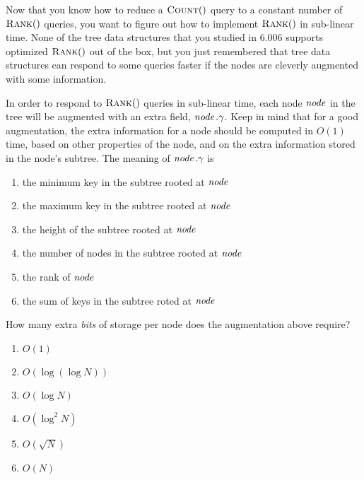 \documentclass[12pt,twoside]{article}
\begin{document}
\begin{problems}
Now that you know how to reduce a $\textnormal{\scshape Count}()$ query to a constant number of
$\textnormal{\scshape Rank}()$ queries, you want to figure out how to implement
$\textnormal{\scshape Rank}()$ in sub-linear time. None of the tree data structures that you
studied in 6.006 supports optimized $\textnormal{\scshape Rank}()$ out of the box, but you just
remembered that tree data structures can respond to some queries faster if the
nodes are cleverly augmented with some information.

\begin{problemparts}
\problempart {} In order to respond to $\textnormal{\scshape Rank}()$ queries in
sub-linear time, each node $\id{node}$ in the tree will be augmented with an
extra field, $\attribix{node}{\gamma}$. Keep in mind that for a good
augmentation, the extra information for a node should be computed in $O(1)$
time, based on other properties of the node, and on the extra information stored
in the node's subtree. The meaning of $\attribix{node}{\gamma}$ is
\begin{enumerate}
  \item the minimum key in the subtree rooted at $\id{node}$
  \item the maximum key in the subtree rooted at $\id{node}$
  \item the height of the subtree rooted at $\id{node}$
  \item the number of nodes in the subtree rooted at $\id{node}$
  \item the rank of $\id{node}$
  \item the sum of keys in the subtree roted at $\id{node}$
\end{enumerate}

\problempart {} How many extra \textit{bits} of storage per node does
the augmentation above require?
\begin{enumerate}
  \item $O(1)$
  \item $O(\log(\log N))$
  \item $O(\log N)$
  \item $O(\log^2 N)$
  \item $O(\sqrt{N})$
  \item $O(N)$
\end{enumerate}
\end{problemparts}


\end{problems}
\end{document}
